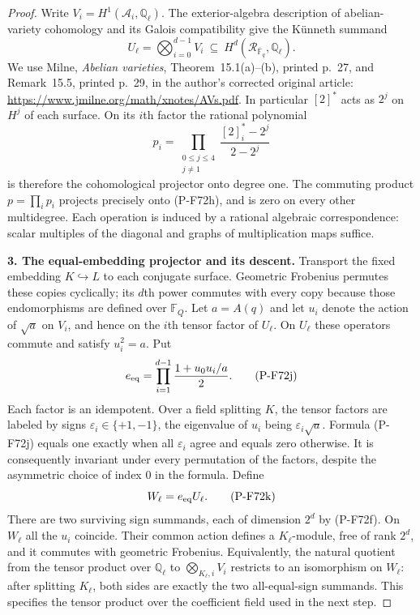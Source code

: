 \begin{proof}
Write $V_i=H^1(\mathcal A_i,\mathbb Q_\ell)$.
The exterior-algebra description of abelian-variety
cohomology and its Galois compatibility give the
K\"unneth summand
\[
       U_\ell=\bigotimes_{i=0}^{d-1}V_i
              \ \subseteq\ H^d(\mathcal R_{\overline{\mathbb F}_q},
                                      \mathbb Q_\ell).        \tag{P-F72h}
\]
We use Milne, \emph{Abelian varieties}, Theorem~15.1(a)--(b),
printed p.~27, and Remark~15.5, printed p.~29, in the
author's corrected original article:
\url{https://www.jmilne.org/math/xnotes/AVs.pdf}.
In particular $[2]^*$ acts as $2^j$ on $H^j$ of each
surface.  On its $i$th factor the rational polynomial
\[
             p_i=\prod_{\substack{0\le j\le4\\j\ne1}}
                    \frac{[2]_i^*-2^j}{2-2^j}
                                                               \tag{P-F72i}
\]
is therefore the cohomological projector onto degree one.
The commuting product $p=\prod_i p_i$ projects precisely
onto (P-F72h), and is zero on every other multidegree.
Each operation is induced by a rational algebraic
correspondence: scalar multiples of the diagonal and
graphs of multiplication maps suffice.

\par\medskip\noindent\textbf{3. The equal-embedding projector and its descent.}
Transport the fixed embedding $K\hookrightarrow L$ to
each conjugate surface.  Geometric Frobenius permutes these
copies cyclically; its $d$th power commutes with every
copy because those endomorphisms are defined over
$\mathbb F_Q$.  Let $a=A(q)$ and let $u_i$ denote the
action of $\sqrt a$ on $V_i$, and hence on the $i$th
tensor factor of $U_\ell$.  On $U_\ell$ these operators
commute and satisfy $u_i^2=a$.  Put
\[
             e_{\rm eq}=
                 \prod_{i=1}^{d-1}
                       \frac{1+u_0u_i/a}{2}.                 \tag{P-F72j}
\]
Each factor is an idempotent.  Over a field splitting $K$,
the tensor factors are labeled by signs
$\varepsilon_i\in\{+1,-1\}$, the eigenvalue of $u_i$
being $\varepsilon_i\sqrt a$.  Formula (P-F72j) equals
one exactly when all $\varepsilon_i$ agree and equals
zero otherwise.  It is consequently invariant under
every permutation of the factors, despite the asymmetric
choice of index $0$ in the formula.  Define
\[
                           W_\ell=e_{\rm eq}U_\ell.
                                                               \tag{P-F72k}
\]
There are two surviving sign summands, each of dimension
$2^d$ by (P-F72f).  On $W_\ell$ all the $u_i$ coincide.
Their common action defines a $K_\ell$-module, free of
rank $2^d$, and it commutes with geometric Frobenius.
Equivalently, the natural quotient from the tensor product
over $\mathbb Q_\ell$ to $\bigotimes_{K_\ell,i}V_i$
restricts to an isomorphism on $W_\ell$: after splitting
$K_\ell$, both sides are exactly the two all-equal-sign
summands.  This specifies the tensor product over the
coefficient field used in the next step.


\end{proof}
